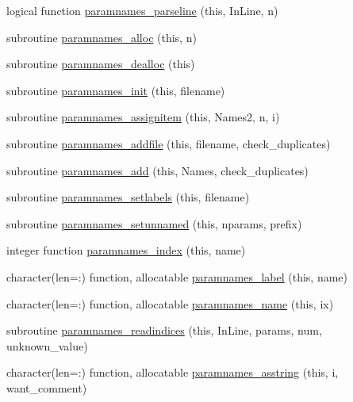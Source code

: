 \begin{DoxyCompactItemize}
\item 
logical function \mbox{\hyperlink{namespaceparamnames_a6d210fed8da76c1fe28e96b8c0724666}{paramnames\+\_\+parseline}} (this, In\+Line, n)
\item 
subroutine \mbox{\hyperlink{namespaceparamnames_a3e5401d3e44bed7bfdeed12938fa58fa}{paramnames\+\_\+alloc}} (this, n)
\item 
subroutine \mbox{\hyperlink{namespaceparamnames_a0abbaf0b2bcd5b60c2d7c16746b07934}{paramnames\+\_\+dealloc}} (this)
\item 
subroutine \mbox{\hyperlink{namespaceparamnames_a1e5be5e1dda784956ba3a9d7985e7f15}{paramnames\+\_\+init}} (this, filename)
\item 
subroutine \mbox{\hyperlink{namespaceparamnames_a00d55ae57c0418d420115dfef427565f}{paramnames\+\_\+assignitem}} (this, Names2, n, i)
\item 
subroutine \mbox{\hyperlink{namespaceparamnames_a962b36a1c8121b164c4206bdc3223ea7}{paramnames\+\_\+addfile}} (this, filename, check\+\_\+duplicates)
\item 
subroutine \mbox{\hyperlink{namespaceparamnames_a6f6eda35d34074cc502b9beddae16e62}{paramnames\+\_\+add}} (this, Names, check\+\_\+duplicates)
\item 
subroutine \mbox{\hyperlink{namespaceparamnames_a84f661e30d02319c827007cbbe6b587c}{paramnames\+\_\+setlabels}} (this, filename)
\item 
subroutine \mbox{\hyperlink{namespaceparamnames_a14599044d57b0e3f49f29352409664d9}{paramnames\+\_\+setunnamed}} (this, nparams, prefix)
\item 
integer function \mbox{\hyperlink{namespaceparamnames_a5c76e741768703cbbdcc06df7508eb55}{paramnames\+\_\+index}} (this, name)
\item 
character(len=\+:) function, allocatable \mbox{\hyperlink{namespaceparamnames_a67f4dfa5bf287848c1f621644fd7d32b}{paramnames\+\_\+label}} (this, name)
\item 
character(len=\+:) function, allocatable \mbox{\hyperlink{namespaceparamnames_a05a1562d6920ecef38e54e88dc6aa7a3}{paramnames\+\_\+name}} (this, ix)
\item 
subroutine \mbox{\hyperlink{namespaceparamnames_a1f770d70e7cc5a35f6a617f5ae2f4c07}{paramnames\+\_\+readindices}} (this, In\+Line, params, num, unknown\+\_\+value)
\item 
character(len=\+:) function, allocatable \mbox{\hyperlink{namespaceparamnames_a16117a38b771ac05b4b1655b1f2d78a8}{paramnames\+\_\+asstring}} (this, i, want\+\_\+comment)

\end{DoxyCompactItemize}
